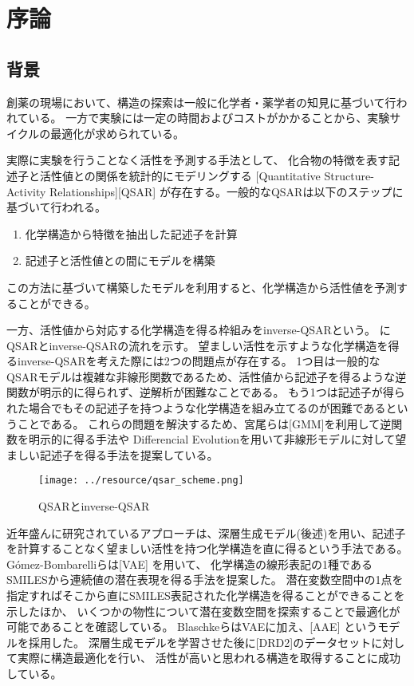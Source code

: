 \chapter{序論}

\section{背景}
創薬の現場において、構造の探索は一般に化学者・薬学者の知見に基づいて行われている。
一方で実験には一定の時間およびコストがかかることから、実験サイクルの最適化が求められている。

実際に実験を行うことなく活性を予測する手法として、
化合物の特徴を表す記述子と活性値との関係を統計的にモデリングする
[Quantitative Structure-Activity Relationships][QSAR]
が存在する。一般的なQSARは以下のステップに基づいて行われる。
\begin{enumerate}
\item 化学構造から特徴を抽出した記述子を計算
\item 記述子と活性値との間にモデルを構築
\end{enumerate}
この方法に基づいて構築したモデルを利用すると、化学構造から活性値を予測することができる。

一方、活性値から対応する化学構造を得る枠組みをinverse-QSARという。
にQSARとinverse-QSARの流れを示す。
望ましい活性を示すような化学構造を得るinverse-QSARを考えた際には2つの問題点が存在する。
1つ目は一般的なQSARモデルは複雑な非線形関数であるため、活性値から記述子を得るような逆関数が明示的に得られず、逆解析が困難なことである。
もう1つは記述子が得られた場合でもその記述子を持つような化学構造を組み立てるのが困難であるということである。
これらの問題を解決するため、宮尾らは[GMM]を利用して逆関数を明示的に得る手法\cite{Miyao}や
Differencial Evolutionを用いて非線形モデルに対して望ましい記述子を得る手法\cite{Miyao2017}を提案している。
\begin{figure}[tbp]
    \centering
    \texttt{[image: ../resource/qsar\_scheme.png]}
    \caption{QSARとinverse-QSAR} \label{fig:qsar_scheme}
\end{figure}

近年盛んに研究されているアプローチは、深層生成モデル(後述)を用い、記述子を計算することなく望ましい活性を持つ化学構造を直に得るという手法である。
G\'{o}mez-Bombarelliらは[VAE] \cite{Kingma2014, Doersch2016}を用いて、
化学構造の線形表記の1種であるSMILESから連続値の潜在表現を得る手法を提案した\cite{Gomez-Bombarelli2016}。
潜在変数空間中の1点を指定すればそこから直にSMILES表記された化学構造を得ることができることを示したほか、
いくつかの物性について潜在変数空間を探索することで最適化が可能であることを確認している。
BlaschkeらはVAEに加え、[AAE] \cite{aae}というモデルを採用した。
深層生成モデルを学習させた後に[DRD2]のデータセットに対して実際に構造最適化を行い、
活性が高いと思われる構造を取得することに成功している\cite{Blaschke2018}。

